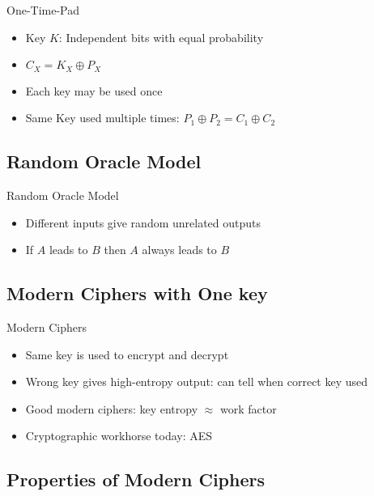 \begin{concept}{One-Time-Pad}\\
    \begin{itemize}
        \item Key $K$: Independent bits with equal probability
        \item $C_X = K_X \oplus P_X$
        \item Each key may be used once
        \item Same Key used multiple times: $P_1 \oplus P_2 = C_1 \oplus C_2$
    \end{itemize}
\end{concept}


\subsection{Random Oracle Model}

\begin{concept}{Random Oracle Model}\\
    \begin{itemize}
        \item Different inputs give random unrelated outputs
        \item If $A$ leads to $B$ then $A$ always leads to $B$
    \end{itemize}
\end{concept}

\subsection{Modern Ciphers with One key}

\begin{concept}{Modern Ciphers}\\
    \begin{itemize}
        \item Same key is used to encrypt and decrypt
        \item Wrong key gives high-entropy output: can tell when correct key used
        \item Good modern ciphers: key entropy $\approx$ work factor
        \item Cryptographic workhorse today: AES
    \end{itemize}
\end{concept}

\subsection{Properties of Modern Ciphers}

